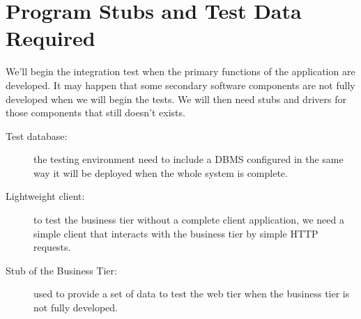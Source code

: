 \section{Program Stubs and Test Data Required}

We'll begin the integration test when the primary functions of the application are developed. It may happen that some secondary software components are not fully developed when we will begin the tests. 
We will then need stubs and drivers for those components that still doesn't exists.

\begin{description}
	\item[Test database:] the testing environment need to include a DBMS configured in the same way it will be deployed when the whole system is complete.
	\item[Lightweight client:] to test the business tier without a complete client application, we need a simple client that interacts with the business tier by simple HTTP requests.
	\item[Stub of the Business Tier:] used to provide a set of data to test the web tier when the business tier is not fully developed.
\end{description}